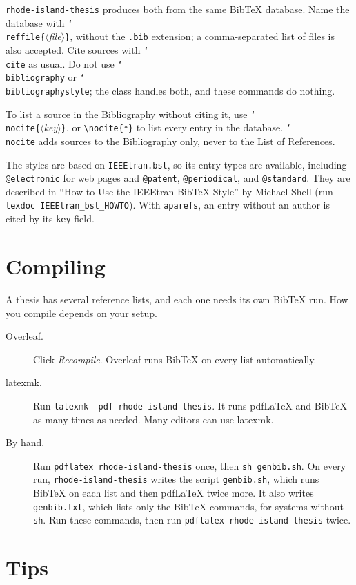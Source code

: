 \documentclass[11pt]{article}
\newcommand\cls{\texttt{rhode-island-thesis}}
\newcommand\cs[1]{\texttt{\char`\\#1}}
\newcommand\meta[1]{\textit{$\langle$#1$\rangle$}}
\newcommand\marg[1]{\texttt{\{}\meta{#1}\texttt{\}}}
\newcommand\opt[1]{\texttt{#1}}
\newcommand\file[1]{\texttt{#1}}
\begin{document}
\noindent \cls{} produces both from the same Bib\TeX{} database.
Name the database with \cs{reffile}\marg{file}, without the \file{.bib}
extension; a comma-separated list of files is also accepted.
Cite sources with \cs{cite} as usual.
Do not use \cs{bibliography} or \cs{bibliographystyle}; the class handles
both, and these commands do nothing.

To list a source in the Bibliography without citing it, use
\cs{nocite}\marg{key}, or \verb|\nocite{*}| to list every entry in the
database.
\cs{nocite} adds sources to the Bibliography only, never to the List of
References.

The styles are based on \texttt{IEEEtran.bst}, so its entry types are
available, including \texttt{@electronic} for web pages and \texttt{@patent},
\texttt{@periodical}, and \texttt{@standard}.
They are described in ``How to Use the IEEEtran Bib\TeX{} Style'' by Michael
Shell (run \verb|texdoc IEEEtran_bst_HOWTO|).
With \opt{aparefs}, an entry without an author is cited by its \texttt{key}
field.

\section{Compiling}\label{sec:compile}

A thesis has several reference lists, and each one needs its own Bib\TeX{}
run.
How you compile depends on your setup.
\begin{description}
\item[Overleaf.] Click \emph{Recompile}. Overleaf runs Bib\TeX{} on every list
  automatically.
\item[latexmk.] Run \verb|latexmk -pdf rhode-island-thesis|. It runs pdf\LaTeX{} and
  Bib\TeX{} as many times as needed. Many editors can use latexmk.
\item[By hand.] Run \verb|pdflatex rhode-island-thesis| once, then \verb|sh genbib.sh|.
  On every run, \cls{} writes the script \file{genbib.sh}, which runs Bib\TeX{}
  on each list and then pdf\LaTeX{} twice more. It also writes
  \file{genbib.txt}, which lists only the Bib\TeX{} commands, for systems
  without \texttt{sh}. Run these commands, then run \verb|pdflatex rhode-island-thesis|
  twice.
\end{description}

\section{Tips}
\end{document}
